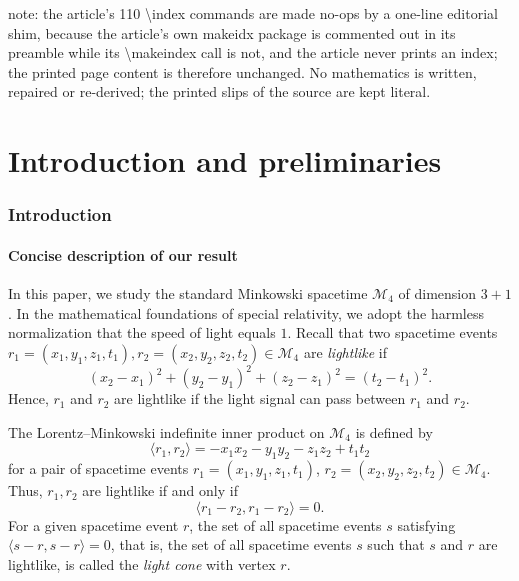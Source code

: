 \documentclass[10pt,a4paper]{amsart}
\providecommand{\index}[1]{}
\theoremstyle{definition}
\theoremstyle{remark}
\numberwithin{subsection}{section}
\numberwithin{equation}{section}
\begin{document}
note: the article's 110 \textbackslash{}index commands are made no-ops by a one-line editorial shim, because the article's own makeidx package is commented out in its preamble while its \textbackslash{}makeindex call is not, and the article never prints an index; the printed page content is therefore unchanged. No mathematics is written, repaired or re-derived; the printed slips of the source are kept literal.
\part{Introduction and preliminaries}

\section{Introduction}

\subsection{Concise description of our result}
In this paper, we study the standard Minkowski spacetime \index{Minkowski spacetime} $\mathcal{M}_4$ \index{$M_4$@$\mathcal{M}_4$} of dimension $3+1$.
In the mathematical foundations of special relativity, we adopt the harmless normalization that the speed of light equals $1$.
Recall that two spacetime events $r_1 = (x_1 , y_1 , z_1 , t_1), r_2 = (x_2, y_2, z_2 , t_2 ) \in \mathcal{M}_4$ are \emph{lightlike} \index{lightlike} if
\[
(x_2 - x_1)^2 + (y_2 - y_1)^2 + (z_2 - z_1)^2 = (t_2 - t_1)^2 .
\]
Hence, $r_1$ and $r_2$ are lightlike if the light signal can pass between $r_1$ and $r_2$.


The Lorentz--Minkowski indefinite inner product \index{Lorentz--Minkowski indefinite inner product} on $\mathcal{M}_4$ is defined by \index{$\langle\cdot, \cdot\rangle$}
\[
\langle r_1 , r_2 \rangle = -x_1 x_2 - y_1 y_2  -z_1 z_2  + t_1 t_2 
\]
for a pair of spacetime events $r_1 = (x_1 , y_1 , z_1 , t_1)$, $r_2 = (x_2, y_2, z_2 , t_2 ) \in \mathcal{M}_4$.
Thus, $r_1 , r_2$ are lightlike if and only if 
\[
\langle r_1 - r_2 , r_1 - r_2 \rangle = 0  .
\]
For a given spacetime event $r$, the set of all spacetime events $s$ satisfying $\langle s - r , s - r \rangle = 0$, that is, the set of all spacetime events $s$ such that $s$ and $r$ are lightlike,
is called the \emph{light cone} \index{light cone} with vertex $r$.
\end{document}
